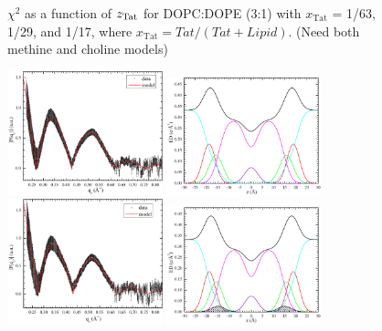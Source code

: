 \begin{figure}[htbp]
  \caption{$\chi^2$ as a function of $z_\textrm{Tat}$ for DOPC:DOPE (3:1) with 
  $x_\textrm{Tat}$ = 1/63, 1/29, and 1/17, where $x_\textrm{Tat}=Tat/(Tat+Lipid)$.
  (Need both methine and choline models)}
  \label{fig:DOPCDOPE3to1_Tat_X2}
\end{figure}

\begin{figure}[htbp]
  \centering
  \includegraphics[width=0.4\textwidth]{figures/Tat/SDP_Results/XFF/DOPCDOPE1to1_XFF1}
  \includegraphics[width=0.4\textwidth]{./figures/Tat/SDP_Results/EDP/DOPCDOPE1to1_EDP1}
  \includegraphics[width=0.4\textwidth]{figures/Tat/SDP_Results/XFF/DOPCDOPE1to1_Tat_62to1_3p0_XFF1}
  \includegraphics[width=0.4\textwidth]{./figures/Tat/SDP_Results/EDP/DOPCDOPE1to1_Tat_62to1_3p0_EDP1}

\end{figure}
